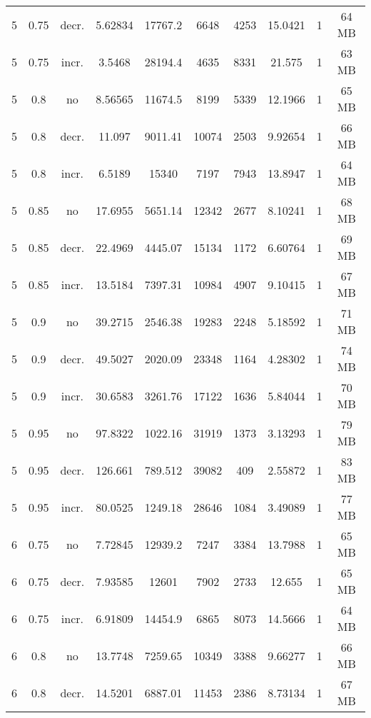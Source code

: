 \begin{longtable}{c|c|c|c|c|c|c|c|c|c}
  5   &  0.75  & decr. & 5.62834  &  17767.2  &  6648   &  4253  &  15.0421  &  1  &  64  MB \\
  5   &  0.75  & incr. & 3.5468   &  28194.4  &  4635   &  8331  &  21.575   &  1  &  63  MB \\
  \hline
  5   &  0.8   & no    & 8.56565  &  11674.5  &  8199   &  5339  &  12.1966  &  1  &  65  MB \\
  5   &  0.8   & decr. & 11.097   &  9011.41  &  10074  &  2503  &  9.92654  &  1  &  66  MB \\
  5   &  0.8   & incr. & 6.5189   &  15340    &  7197   &  7943  &  13.8947  &  1  &  64  MB \\
  \hline
  5   &  0.85  & no    & 17.6955  &  5651.14  &  12342  &  2677  &  8.10241  &  1  &  68  MB \\
  5   &  0.85  & decr. & 22.4969  &  4445.07  &  15134  &  1172  &  6.60764  &  1  &  69  MB \\
  5   &  0.85  & incr. & 13.5184  &  7397.31  &  10984  &  4907  &  9.10415  &  1  &  67  MB \\
  \hline
  5   &  0.9   & no    & 39.2715  &  2546.38  &  19283  &  2248  &  5.18592  &  1  &  71  MB \\
  5   &  0.9   & decr. & 49.5027  &  2020.09  &  23348  &  1164  &  4.28302  &  1  &  74  MB \\
  5   &  0.9   & incr. & 30.6583  &  3261.76  &  17122  &  1636  &  5.84044  &  1  &  70  MB \\
  \hline
  5   &  0.95  & no    & 97.8322  &  1022.16  &  31919  &  1373  &  3.13293  &  1  &  79  MB \\
  5   &  0.95  & decr. & 126.661  &  789.512  &  39082  &  409   &  2.55872  &  1  &  83  MB \\
  5   &  0.95  & incr. & 80.0525  &  1249.18  &  28646  &  1084  &  3.49089  &  1  &  77  MB \\
  \hline
  6   &  0.75  & no    & 7.72845  &  12939.2  &  7247   &  3384  &  13.7988  &  1  &  65  MB \\
  6   &  0.75  & decr. & 7.93585  &  12601    &  7902   &  2733  &  12.655   &  1  &  65  MB \\
  6   &  0.75  & incr. & 6.91809  &  14454.9  &  6865   &  8073  &  14.5666  &  1  &  64  MB \\
  \hline
  6   &  0.8   & no    & 13.7748  &  7259.65  &  10349  &  3388  &  9.66277  &  1  &  66  MB \\
  6   &  0.8   & decr. & 14.5201  &  6887.01  &  11453  &  2386  &  8.73134  &  1  &  67  MB \\

\end{longtable}
